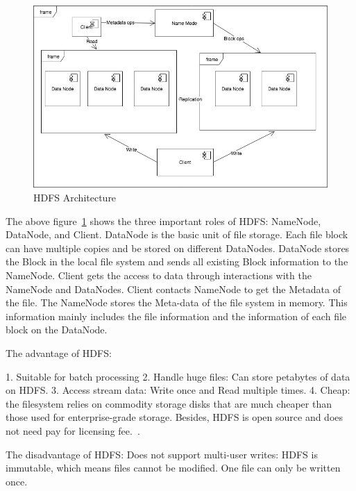 \begin{figure}[!ht]
  \centering\includegraphics[width=\columnwidth]{images/HDFS.jpg}
  \caption{HDFS Architecture}\label{f:hdfs}
\end{figure}


The above figure~\ref{f:hdfs} shows the three important roles of HDFS: NameNode, 
DataNode, and Client. DataNode is the basic unit of file storage. Each file block 
can have multiple copies and be stored on different DataNodes. DataNode stores the 
Block in the local file system and sends all existing Block information to the 
NameNode. Client gets the access to data through interactions with the NameNode and 
DataNodes. Client contacts NameNode to get the Metadata of the file. The NameNode 
stores the Meta-data of the file system in memory. This information mainly includes 
the file information and the information of each file block on the DataNode. 

The advantage of HDFS:

1. Suitable for batch processing
2. Handle huge files: Can store petabytes of data on HDFS.
3. Access stream data: Write once and Read multiple times.
4. Cheap: the filesystem relies on commodity storage disks that are much cheaper 
than those used for enterprise-grade storage. Besides, HDFS is open source and does 
not need pay for licensing fee.~\cite{hid-sp18-508-hdfs}.

The disadvantage of HDFS:
 Does not support multi-user writes: HDFS is immutable, which means files cannot 
 be modified. One file can only be written once. 

